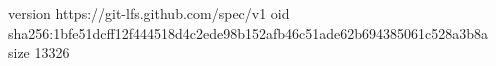 version https://git-lfs.github.com/spec/v1
oid sha256:1bfe51dcff12f444518d4c2ede98b152afb46c51ade62b694385061c528a3b8a
size 13326
